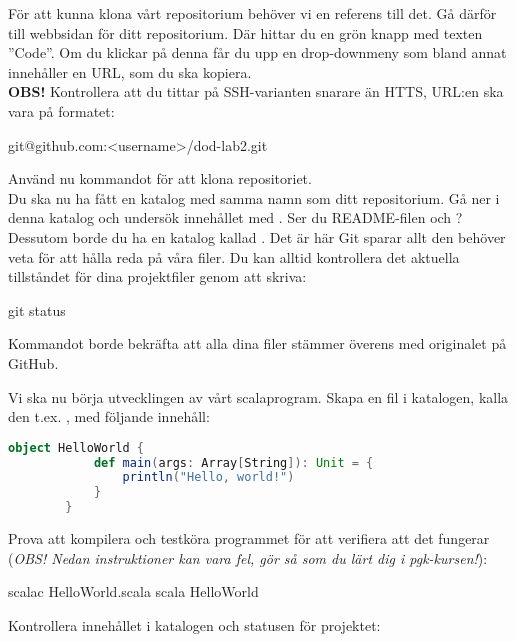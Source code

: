 \begin{Datorarbete}
	För att kunna klona vårt repositorium behöver vi en referens till det. Gå därför till webbsidan för ditt repositorium. Där hittar du en grön knapp med texten ''Code''. Om du klickar på denna får du upp en drop-downmeny som bland annat innehåller en URL, som du ska kopiera.
	\\


	\textbf{OBS!} Kontrollera att du tittar på SSH-varianten snarare än HTTS, URL:en ska vara på formatet:
	\vspace{-.5em}
	\begin{Code}
		git@github.com:<username>/dod-lab2.git
	\end{Code}
	\vspace{.5em}

	\code{[\ref{git-clone}]} Använd nu kommandot  för att klona repositoriet.
	\\

	Du ska nu ha fått en katalog med samma namn som ditt repositorium. Gå ner i denna katalog och undersök innehållet med . Ser du README-filen och ? Dessutom borde du ha en katalog kallad . Det är här Git sparar allt den behöver veta för att hålla reda på våra filer.
	Du kan alltid kontrollera det aktuella tillståndet för dina projektfiler genom att skriva:

	\begin{Code}
		git status
	\end{Code}

	Kommandot borde bekräfta att alla dina filer stämmer överens med originalet på GitHub.

	\item Vi ska nu börja utvecklingen av vårt scalaprogram. Skapa en fil i katalogen, kalla den t.ex. , med följande innehåll:

	\begin{lstlisting}[language=scala]
		object HelloWorld {
			def main(args: Array[String]): Unit = {
				println("Hello, world!")
			}
		}
	\end{lstlisting}

	Prova att kompilera och testköra programmet för att verifiera att det fungerar (\emph{OBS! Nedan instruktioner kan vara fel, gör så som du lärt dig i pgk-kursen!}):

	\begin{Code}
		scalac HelloWorld.scala
		scala HelloWorld
	\end{Code}

	Kontrollera innehållet i katalogen och statusen för projektet:


\end{Datorarbete}
